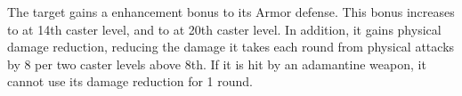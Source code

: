 \begin{spellheader}
    \begin{spelltargetinginfo}
    \end{spelltargetinginfo}
\end{spellheader}
\begin{spellcontent}
    \begin{spelleffects}
        \spelleffect The target gains a  enhancement bonus to its Armor defense. This bonus increases to  at 14th caster level, and to  at 20th caster level. In addition, it gains physical damage reduction, reducing the damage it takes each round from physical attacks by 8  per two caster levels above 8th. If it is hit by an adamantine weapon, it cannot use its damage reduction for 1 round.
        \spelldur{\durshort}
    \end{spelleffects}
\end{spellcontent}
\begin{spellfooter}

\end{spellfooter}

